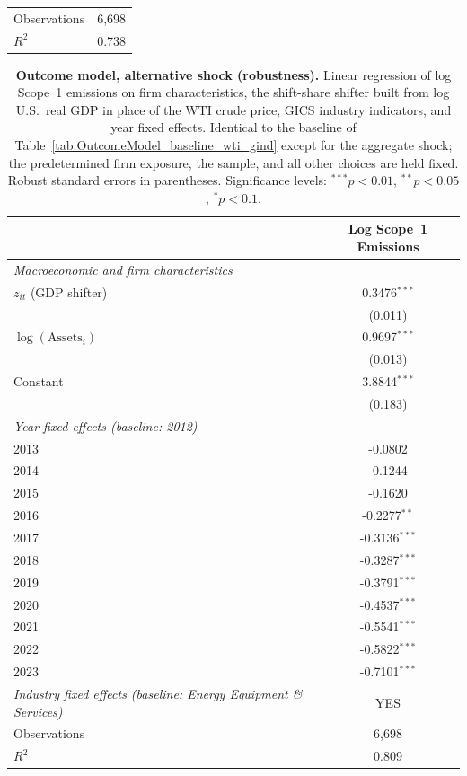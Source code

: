 \documentclass[a4paper,12pt]{article}
\begin{document}
\begin{table}[htbp]
\begin{tabular}{l c}
\midrule
Observations & 6,698 \\
$R^2$ & 0.738 \\
\bottomrule
\end{tabular}

\begin{flushleft}
\footnotesize
\end{flushleft}
\end{table}

\begin{table}[htbp]
\footnotesize
\centering
\caption{\textbf{Outcome model, alternative shock (robustness).} Linear regression of log Scope~1 emissions on firm characteristics, the shift-share shifter built from log U.S.\ real GDP in place of the WTI crude price, GICS industry indicators, and year fixed effects. Identical to the baseline of Table~\ref{tab:OutcomeModel_baseline_wti_gind} except for the aggregate shock; the predetermined firm exposure, the sample, and all other choices are held fixed. Robust standard errors in parentheses. Significance levels: $^{***}p<0.01$, $^{**}p<0.05$, $^{*}p<0.1$.}
\label{tab:OutcomeModel_baseline_gdp_gsec}
\begin{tabular}{l c}
\toprule
 & Log Scope~1 Emissions \\
\midrule
\textit{Macroeconomic and firm characteristics} \\
$z_{it}$ (GDP shifter) & 0.3476$^{***}$ \\
      & (0.011) \\
$\log(\mathrm{Assets}_i)$ & 0.9697$^{***}$ \\
      & (0.013) \\
Constant & 3.8844$^{***}$ \\
      & (0.183) \\

\midrule
\textit{Year fixed effects (baseline: 2012)} \\
2013 & -0.0802 \\
2014 & -0.1244 \\
2015 & -0.1620 \\
2016 & -0.2277$^{**}$ \\
2017 & -0.3136$^{***}$ \\
2018 & -0.3287$^{***}$ \\
2019 & -0.3791$^{***}$ \\
2020 & -0.4537$^{***}$ \\
2021 & -0.5541$^{***}$ \\
2022 & -0.5822$^{***}$ \\
2023 & -0.7101$^{***}$ \\

\midrule
\midrule
\textit{Industry fixed effects (baseline: Energy Equipment \& Services)} & YES \\
Observations & 6,698 \\
$R^2$ & 0.809 \\
\bottomrule
\end{tabular}

\begin{flushleft}
\footnotesize
\end{flushleft}
\end{table}
\end{document}
